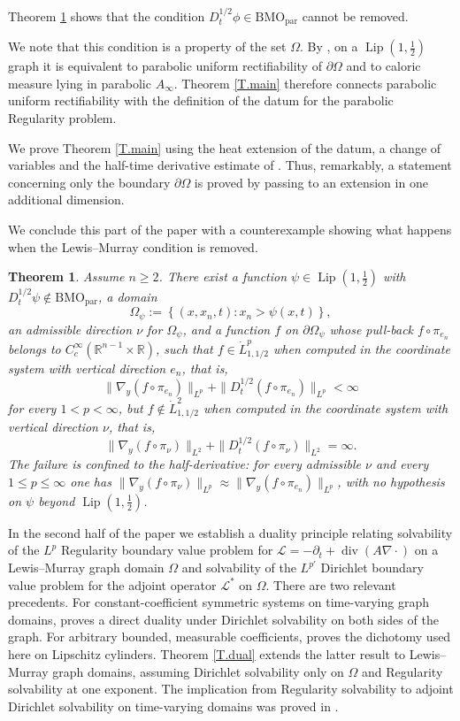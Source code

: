 \documentclass[12pt,leqno]{amsart}
\numberwithin{equation}{section}
\DeclareMathOperator{\Lip}{Lip}
\DeclareMathOperator{\divg}{div}
\newcommand{\R}{\mathbb R}
\newcommand{\set}[1]{\left\{#1\right\}}
\newcommand{\om}{\Omega}
\newcommand{\pom}{\partial\Omega}
\newcommand{\pd}{\partial}
\newcommand{\dhalf}{D_t^{1/2}}
\newcommand{\BMOpar}{\mathrm{BMO}_{\mathrm{par}}}
\newcommand{\LL}{\mathcal L}
\theoremstyle{plain}
\newtheorem{theorem}[equation]{Theorem}
\theoremstyle{remark}
\begin{document}
Theorem \ref{T.counter} shows that the condition
$\dhalf\phi\in\BMOpar$ cannot be removed.\medskip

\noindent We note that this condition is a property of the set $\om$.
By \cite[Theorem 1.2]{BHMN}, on a $\Lip(1,\tfrac12)$ graph it is equivalent
to parabolic uniform rectifiability of $\pom$ and to caloric measure lying in
parabolic $A_\infty$. Theorem \ref{T.main} therefore connects parabolic
uniform rectifiability with the definition of the datum for the parabolic
Regularity problem.\medskip

We prove Theorem \ref{T.main} using the heat extension of the datum, a change
of variables and the half-time derivative estimate of
\cite[Theorem 1.7]{DLPN}. Thus, remarkably, a statement concerning only the
boundary $\pom$ is proved by passing to an extension in one additional
dimension.\medskip

We conclude this part of the paper with a counterexample showing what happens
when the Lewis--Murray condition is removed.

\begin{theorem}\label{T.counter}
Assume $n\ge2$. There exist a function $\psi\in\Lip(1,\tfrac12)$ with
$\dhalf\psi\notin\BMOpar$, a domain
$$\om_\psi:=\set{(x,x_n,t):x_n>\psi(x,t)},$$
an admissible direction $\nu$ for $\om_\psi$, and a function $f$ on
$\pd\om_\psi$ whose pull-back $f\circ\pi_{e_n}$ belongs to
$C^\infty_c(\R^{n-1}\times\R)$, such that $f\in\dot L^{p}_{1,1/2}$ when
computed in the coordinate system with vertical direction $e_n$, that is,
$$\|\nabla_y (f\circ\pi_{e_n})\|_{L^p}+\|\dhalf (f\circ\pi_{e_n})\|_{L^p}<\infty$$
for every $1<p<\infty$, but $f\notin\dot L^{2}_{1,1/2}$ when computed in the
coordinate system with vertical direction $\nu$, that is,
$$\|\nabla_y (f\circ\pi_{\nu})\|_{L^2}+\|\dhalf (f\circ\pi_{\nu})\|_{L^2}=\infty.$$
The failure is confined to the half-derivative: for every admissible $\nu$ and
every $1\le p\le\infty$ one has $\|\nabla_y(f\circ\pi_\nu)\|_{L^{p}}
\approx\|\nabla_y(f\circ\pi_{e_n})\|_{L^{p}}$, with no hypothesis on $\psi$
beyond $\Lip(1,\tfrac12)$.
\end{theorem}

In the second half of the paper we establish a duality principle relating
solvability of the $L^p$ Regularity boundary value problem for
$\LL=-\pd_t+\divg(A\nabla\cdot)$ on a Lewis--Murray graph domain $\om$ and
solvability of the $L^{p'}$ Dirichlet boundary value problem for the adjoint
operator $\LL^*$ on $\om$. There are
two relevant precedents. For constant-coefficient symmetric systems on
time-varying graph domains, \cite[Theorem 4]{Nys06} proves a direct duality
under Dirichlet solvability on both sides of the graph. For arbitrary bounded,
measurable coefficients, \cite{DN} proves the dichotomy used here on Lipschitz
cylinders. Theorem \ref{T.dual} extends the latter result to Lewis--Murray
graph domains, assuming Dirichlet solvability only on $\om$ and Regularity
solvability at one exponent. The implication from Regularity solvability to
adjoint Dirichlet solvability on time-varying domains was proved in
\cite{DD}.\medskip
\end{document}
